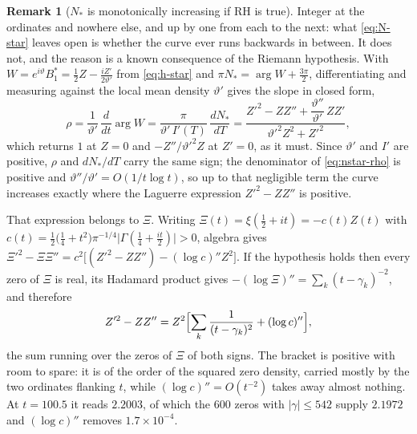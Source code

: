 \documentclass[11pt]{article}
\theoremstyle{definition}
\newtheorem{remark}[theorem]{Remark}
\begin{document}
\begin{remark}[$N_{\ast}$ is monotonically increasing if RH is true]
\label{rem:nstar-mono}
Integer at the ordinates and nowhere else, and up by one from each to the next:
what \eqref{eq:N-star} leaves open is whether the curve ever runs backwards in
between. It does not, and the reason is a known consequence of the Riemann
hypothesis. With $W=e^{i\vartheta}B_1^{\ast}=\tfrac12Z-\tfrac{iZ'}{2\vartheta'}$ from
\eqref{eq:h-star} and $\pi N_{\ast}=\arg W+\tfrac{3\pi}{2}$, differentiating
and measuring against the local mean density $\vartheta'$ gives the slope in closed
form,
\begin{equation}\label{eq:nstar-rho}
\rho=\frac{1}{\vartheta'}\,\frac{d}{dt}\arg W
=\frac{\pi}{\vartheta'\,I'(T)}\,\frac{dN_{\ast}}{dT}
=\frac{Z'^2-ZZ''+\dfrac{\vartheta''}{\vartheta'}\,ZZ'}{\vartheta'^2Z^2+Z'^2},
\end{equation}
which returns $1$ at $Z=0$ and $-Z''/\vartheta'^2Z$ at $Z'=0$, as it must. Since
$\vartheta'$ and $I'$ are positive, $\rho$ and $dN_{\ast}/dT$ carry the same sign;
the denominator of \eqref{eq:nstar-rho} is positive and
$\vartheta''/\vartheta'=O(1/t\log t)$, so up to that negligible term the curve
increases exactly where the Laguerre expression $Z'^2-ZZ''$ is positive.

That expression belongs to $\Xi$. Writing
$\Xi(t)=\xi(\tfrac12+it)=-c(t)Z(t)$ with
$c(t)=\tfrac12\bigl(\tfrac14+t^2\bigr)\pi^{-1/4}
\bigl|\Gamma(\tfrac14+\tfrac{it}{2})\bigr|>0$, algebra gives
$\Xi'^2-\Xi\Xi''=c^2\bigl[(Z'^2-ZZ'')-(\log c)''Z^2\bigr]$. If the hypothesis
holds then every zero of $\Xi$ is real, its Hadamard product gives
$-(\log\Xi)''=\sum_k(t-\gamma_k)^{-2}$, and therefore
\begin{equation}\label{eq:laguerre-Z}
Z'^2-ZZ''=Z^2\Bigl[\sum_k\frac{1}{(t-\gamma_k)^2}+(\log c)''\Bigr],
\end{equation}
the sum running over the zeros of $\Xi$ of both signs. The bracket is positive
with room to spare: it is of the order of the squared zero density, carried
mostly by the two ordinates flanking $t$, while $(\log c)''=O(t^{-2})$ takes
away almost nothing. At $t=100.5$ it reads $2.2003$, of which the $600$ zeros
with $|\gamma|\leq542$ supply $2.1972$ and $(\log c)''$ removes
$1.7\times10^{-4}$.


\end{remark}
\end{document}
